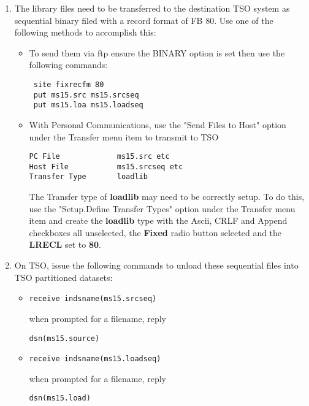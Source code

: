 \documentclass[a4paper,12pt]{report}
\begin{document}
\begin{enumerate}
\item
The library files need to be transferred to the destination TSO system
as sequential binary filed with a record format of FB 80.
Use one of the following methods to accomplish this:
\begin{itemize}
%
%
\item To send them via ftp ensure the BINARY option is set then use
the following commands:
\begin{verbatim}
 site fixrecfm 80
 put ms15.src ms15.srcseq
 put ms15.loa ms15.loadseq
\end{verbatim}
\item With Personal Communications, use the "Send Files to Host"
option under the Transfer menu item to transmit to TSO
\begin{verbatim}
PC File             ms15.src etc
Host File           ms15.srcseq etc
Transfer Type       loadlib
\end{verbatim}
The Transfer type of \textbf{loadlib} may need to be correctly
setup. To do this, use the "Setup.Define Transfer Types" option
under the Transfer menu item and create the \textbf{loadlib} type
with the Ascii, CRLF and Append checkboxes all unselected, the
\textbf{Fixed} radio button selected and the \textbf{LRECL} set to
\textbf{80}.
\end{itemize}
\item
On TSO, issue the following commands to unload these sequential files
into TSO partitioned datasets:
\begin{itemize}
\item
\begin{verbatim}
receive indsname(ms15.srcseq)
\end{verbatim}
when prompted for a filename, reply
\begin{verbatim}
dsn(ms15.source)
\end{verbatim}
\item
\begin{verbatim}
receive indsname(ms15.loadseq)
\end{verbatim}
when prompted for a filename, reply
\begin{verbatim}
dsn(ms15.load)
\end{verbatim}
\end{itemize}

\end{enumerate}
\end{document}
